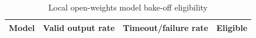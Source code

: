 
\begin{table}[htbp]
\centering
\caption{Local open-weights model bake-off eligibility}
\label{tab:local-model-bakeoff-eligibility}
\begin{tabular}{lrrl}
\hline
Model & Valid output rate & Timeout/failure rate & Eligible \\
\hline
\hline
\end{tabular}
\end{table}
